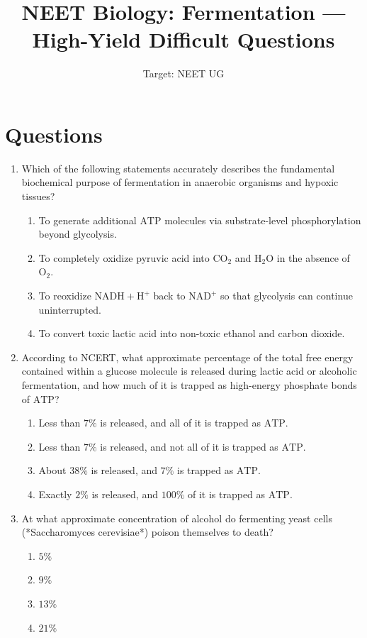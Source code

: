\documentclass[11pt, a4paper]{article}
\title{\textbf{NEET Biology: Fermentation — High-Yield Difficult Questions}}
\author{Target: NEET UG}
\date{}
\begin{document}
\maketitle

\section*{Questions}

\begin{enumerate}[label=\textbf{\arabic*.}]

\item Which of the following statements accurately describes the fundamental biochemical purpose of fermentation in anaerobic organisms and hypoxic tissues?
\begin{enumerate}[label=(\Alph*)]
    \item To generate additional $\text{ATP}$ molecules via substrate-level phosphorylation beyond glycolysis.
    \item To completely oxidize pyruvic acid into $\text{CO}_2$ and $\text{H}_2\text{O}$ in the absence of $\text{O}_2$.
    \item To reoxidize $\text{NADH} + \text{H}^+$ back to $\text{NAD}^+$ so that glycolysis can continue uninterrupted.
    \item To convert toxic lactic acid into non-toxic ethanol and carbon dioxide.
\end{enumerate}

\item According to NCERT, what approximate percentage of the total free energy contained within a glucose molecule is released during lactic acid or alcoholic fermentation, and how much of it is trapped as high-energy phosphate bonds of $\text{ATP}$?
\begin{enumerate}[label=(\Alph*)]
    \item Less than $7\%$ is released, and all of it is trapped as $\text{ATP}$.
    \item Less than $7\%$ is released, and not all of it is trapped as $\text{ATP}$.
    \item About $38\%$ is released, and $7\%$ is trapped as $\text{ATP}$.
    \item Exactly $2\%$ is released, and $100\%$ of it is trapped as $\text{ATP}$.
\end{enumerate}

\item At what approximate concentration of alcohol do fermenting yeast cells (*Saccharomyces cerevisiae*) poison themselves to death?
\begin{enumerate}[label=(\Alph*)]
    \item $5\%$
    \item $9\%$
    \item $13\%$
    \item $21\%$
\end{enumerate}


\end{enumerate}
\end{document}
